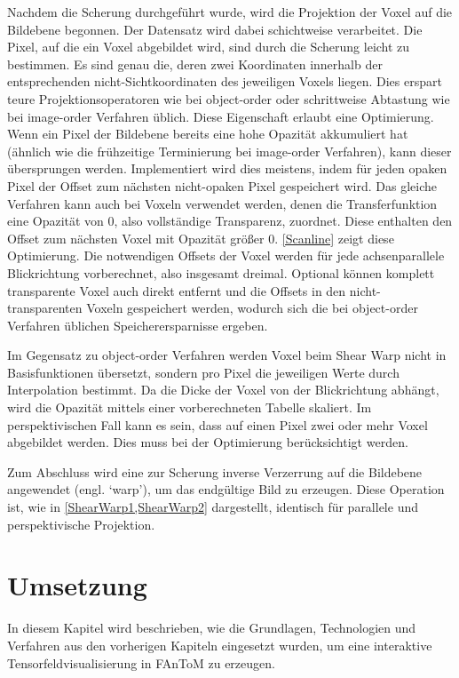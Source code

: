 \documentclass[a4paper,fontsize=12pt,toc=bib,halfparskip,ngerman]{scrartcl}
\begin{document}
Nachdem die Scherung durchgef\"uhrt wurde, wird die Projektion der Voxel auf die Bildebene begonnen. Der Datensatz wird dabei schichtweise verarbeitet. Die Pixel, auf die ein Voxel abgebildet wird, sind durch die Scherung leicht zu bestimmen. Es sind genau die, deren zwei Koordinaten innerhalb der entsprechenden nicht-Sichtkoordinaten des jeweiligen Voxels liegen. Dies erspart teure Projektionsoperatoren wie bei object-order oder schrittweise Abtastung wie bei image-order Verfahren \"ublich. Diese Eigenschaft erlaubt eine Optimierung. Wenn ein Pixel der Bildebene bereits eine hohe Opazit\"at akkumuliert hat (\"ahnlich wie die fr\"uhzeitige Terminierung bei image-order Verfahren), kann dieser \"ubersprungen werden. Implementiert wird dies meistens, indem f\"ur jeden opaken Pixel der Offset zum n\"achsten nicht-opaken Pixel gespeichert wird. Das gleiche Verfahren kann auch bei Voxeln verwendet werden, denen die Transferfunktion eine Opazit\"at von 0, also vollst\"andige Transparenz, zuordnet. Diese enthalten den Offset zum n\"achsten Voxel mit Opazit\"at gr\"o{\ss}er 0. \cref{Scanline} zeigt diese Optimierung. Die notwendigen Offsets der Voxel werden f\"ur jede achsenparallele Blickrichtung vorberechnet, also insgesamt dreimal. Optional k\"onnen komplett transparente Voxel auch direkt entfernt und die Offsets in den nicht-transparenten Voxeln gespeichert werden, wodurch sich die bei object-order Verfahren \"ublichen Speicherersparnisse ergeben. 

Im Gegensatz zu object-order Verfahren werden Voxel beim Shear Warp nicht in Basisfunktionen \"ubersetzt, sondern pro Pixel die jeweiligen Werte durch Interpolation bestimmt. Da die Dicke der Voxel von der Blickrichtung abh\"angt, wird die Opazit\"at mittels einer vorberechneten Tabelle skaliert. Im perspektivischen Fall kann es sein, dass auf einen Pixel zwei oder mehr Voxel abgebildet werden. Dies muss bei der Optimierung ber\"ucksichtigt werden.

Zum Abschluss wird eine zur Scherung inverse Verzerrung auf die Bildebene angewendet (engl. `warp'), um das endg\"ultige Bild zu erzeugen. Diese Operation ist, wie in \cref{ShearWarp1,ShearWarp2} dargestellt, identisch f\"ur parallele und perspektivische Projektion.



\section{Umsetzung}
\label{sec:Umsetzung}
In diesem Kapitel wird beschrieben, wie die Grundlagen, Technologien und Verfahren aus den vorherigen Kapiteln eingesetzt wurden, um eine interaktive Tensorfeldvisualisierung in FAnToM zu erzeugen.
\end{document}
